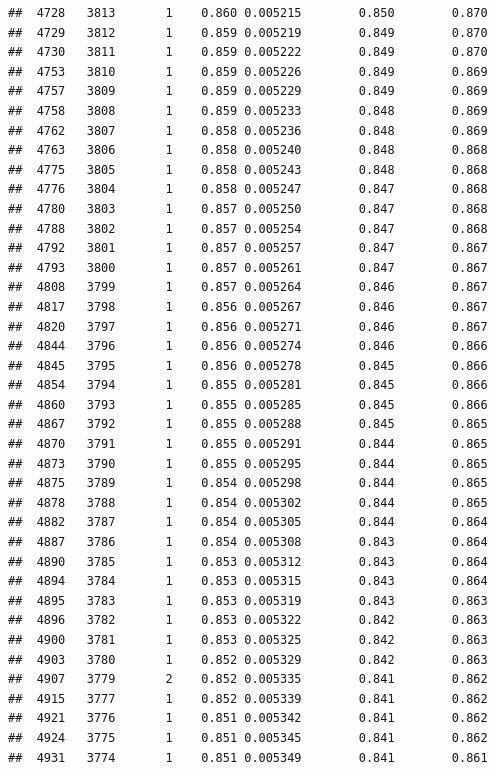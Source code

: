 \documentclass[
]{book}
\begin{document}
\begin{verbatim}
##  4728   3813       1    0.860 0.005215        0.850        0.870
##  4729   3812       1    0.859 0.005219        0.849        0.870
##  4730   3811       1    0.859 0.005222        0.849        0.870
##  4753   3810       1    0.859 0.005226        0.849        0.869
##  4757   3809       1    0.859 0.005229        0.849        0.869
##  4758   3808       1    0.859 0.005233        0.848        0.869
##  4762   3807       1    0.858 0.005236        0.848        0.869
##  4763   3806       1    0.858 0.005240        0.848        0.868
##  4775   3805       1    0.858 0.005243        0.848        0.868
##  4776   3804       1    0.858 0.005247        0.847        0.868
##  4780   3803       1    0.857 0.005250        0.847        0.868
##  4788   3802       1    0.857 0.005254        0.847        0.868
##  4792   3801       1    0.857 0.005257        0.847        0.867
##  4793   3800       1    0.857 0.005261        0.847        0.867
##  4808   3799       1    0.857 0.005264        0.846        0.867
##  4817   3798       1    0.856 0.005267        0.846        0.867
##  4820   3797       1    0.856 0.005271        0.846        0.867
##  4844   3796       1    0.856 0.005274        0.846        0.866
##  4845   3795       1    0.856 0.005278        0.845        0.866
##  4854   3794       1    0.855 0.005281        0.845        0.866
##  4860   3793       1    0.855 0.005285        0.845        0.866
##  4867   3792       1    0.855 0.005288        0.845        0.865
##  4870   3791       1    0.855 0.005291        0.844        0.865
##  4873   3790       1    0.855 0.005295        0.844        0.865
##  4875   3789       1    0.854 0.005298        0.844        0.865
##  4878   3788       1    0.854 0.005302        0.844        0.865
##  4882   3787       1    0.854 0.005305        0.844        0.864
##  4887   3786       1    0.854 0.005308        0.843        0.864
##  4890   3785       1    0.853 0.005312        0.843        0.864
##  4894   3784       1    0.853 0.005315        0.843        0.864
##  4895   3783       1    0.853 0.005319        0.843        0.863
##  4896   3782       1    0.853 0.005322        0.842        0.863
##  4900   3781       1    0.853 0.005325        0.842        0.863
##  4903   3780       1    0.852 0.005329        0.842        0.863
##  4907   3779       2    0.852 0.005335        0.841        0.862
##  4915   3777       1    0.852 0.005339        0.841        0.862
##  4921   3776       1    0.851 0.005342        0.841        0.862
##  4924   3775       1    0.851 0.005345        0.841        0.862
##  4931   3774       1    0.851 0.005349        0.841        0.861

\end{verbatim}
\end{document}
